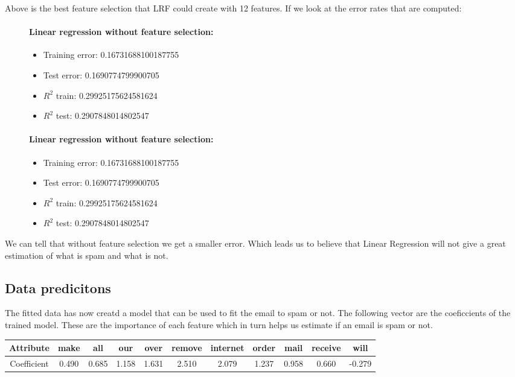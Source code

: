 \documentclass[10pt, paper=a4]{article}
\begin{document}
Above is the best feature selection that LRF could create with 12
features.  If we look at the error rates that are
computed:

\begin{figure}[h]
  \begin{minipage}{0.5\textwidth}
    \paragraph{Linear regression without feature selection:}
    \begin{itemize}
    \item Training error: 0.16731688100187755
    \item Test error:     0.1690774799900705
    \item $R^2$ train:     0.29925175624581624
    \item $R^2$ test:     0.2907848014802547
    \end{itemize}
  \end{minipage} \hfill
  \begin{minipage}{0.5\textwidth}
    \paragraph{Linear regression without feature selection:}
    \begin{itemize}
    \item Training error: 0.16731688100187755
    \item Test error:     0.1690774799900705
    \item $R^2$ train:     0.29925175624581624
    \item $R^2$ test:     0.2907848014802547
    \end{itemize}
  \end{minipage} \vfill
\end{figure}

We can tell that without feature selection we get a smaller
error. Which leads us to believe that Linear Regression will not give
a great estimation of what is spam and what is not.

\subsection{Data predicitons}
The fitted data has now creatd a model that can be used to fit the
email to spam or not.  The following vector are the coeficcients of
the trained model. These are the importance of each feature which in
turn helps us estimate if an email is spam or not.
\begin{table}[h]
\centering
\begin{tabular}{c|c|c|c|c|c|c|c|c|c|c}
\hline Attribute & make & all & our & over & remove & internet & order
& mail & receive & will \\ \hline Coefficient & 0.490 & 0.685 & 1.158
& 1.631 & 2.510 & 2.079 & 1.237 & 0.958 & 0.660 & -0.279 \\ \hline
\end{tabular}
\end{table}
\end{document}
